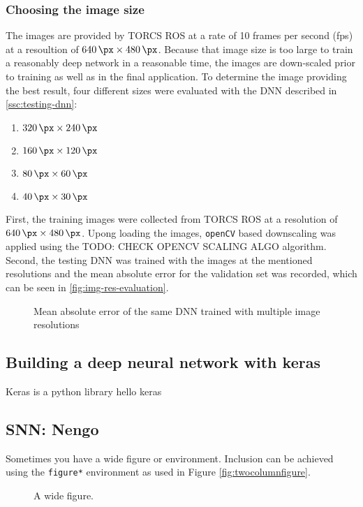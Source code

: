 \documentclass[10pt,a4paper,twoside,journal]{IEEEtran}
\begin{document}
\subsubsection{Choosing the image size}
The images are provided by TORCS ROS \cite{mirus_torcs} at a rate of 10 frames per second (fps) at a resoultion of $ \SI{640}{\px} \times \SI{480}{\px} $. Because that image size is too large
to train a reasonably deep network in a reasonable time, the images are down-scaled prior to training as well as in the final application. To determine the image providing the best result, four different sizes were evaluated with the DNN described in \autoref{ssc:testing-dnn}: 
\begin{enumerate}
	\item $ \SI{320}{\px} \times \SI{240}{\px} $
	\item $ \SI{160}{\px} \times \SI{120}{\px} $
	\item $ \SI{80}{\px} \times \SI{60}{\px} $
	\item $ \SI{40}{\px} \times \SI{30}{\px} $
\end{enumerate}
First, the training images were collected from TORCS ROS at a resolution of $ \SI{640}{\px}\times \SI{480}{\px}$. Upong loading the images, \texttt{openCV} based downscaling was applied using the TODO: CHECK OPENCV SCALING ALGO algorithm. Second, the testing DNN was trained with the images at the mentioned resolutions and the mean absolute error 
for the validation set was recorded, which can be seen in \autoref{fig:img-res-evaluation}.
\begin{figure}
	\centering
	
	\caption{Mean absolute error of the same DNN trained with multiple image resolutions}
	\label{fig:img-res-evaluation}
\end{figure}

\subsection{Building a deep neural network with keras}
\label{ssc:keras}
Keras is a python library 
hello keras \cite{Toshev_2014_CVPR}

\subsection{SNN: Nengo}
\label{ssc:nengo}
Sometimes you have a wide figure or environment. Inclusion can be achieved using
the \texttt{figure*} environment as used in Figure \autoref{fig:twocolumnfigure}.
\begin{figure*}
	\centering
	\fbox{\rule{0pt}{2cm} \rule{1.0\linewidth}{0pt}}
	\caption{A wide figure.}
	\label{fig:twocolumnfigure}
\end{figure*}
\end{document}
